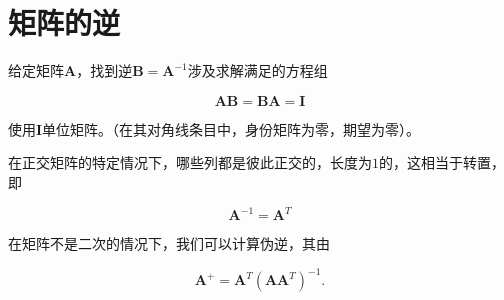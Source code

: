 
\section{矩阵的逆}
给定矩阵$\mathbf{A}$，找到逆$\mathbf{B}=\mathbf{A}^{-1}$涉及求解满足的方程组

\begin{equation}
\mathbf{AB}=\mathbf{BA}=\mathbf{I}
\end{equation}



使用$\mathbf{I}$单位矩阵。（在其对角线条目中，身份矩阵为零，期望为零）。

在正交矩阵的特定情况下，哪些列都是彼此正交的，长度为$1$的，这相当于转置，即

\begin{equation}
\mathbf{A}^{-1}=\mathbf{A}^T
\end{equation}


在矩阵不是二次的情况下，我们可以计算伪逆，其由

\begin{equation}
\mathbf{A}^+=\mathbf{A}^T(\mathbf{AA}^T)^{-1}.
\end{equation}